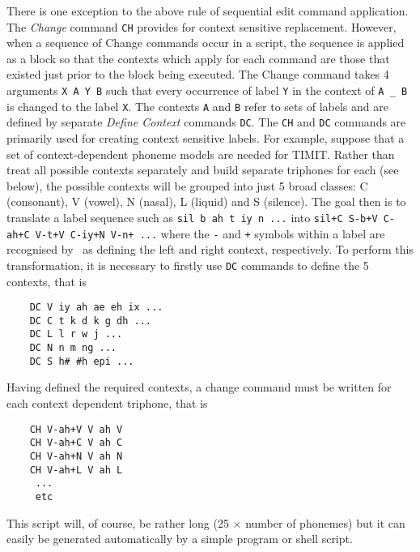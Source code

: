 There is one exception to the above rule of sequential edit command
application.  The {\it Change} command 
\texttt{CH} provides for context
sensitive replacement.  However, when a sequence of Change commands occur
in a script, the sequence is applied as a block so that the contexts
which apply for each command are those that existed just prior to the
block being executed. The Change command takes 4 arguments \texttt{X A Y
B} such that every occurrence of label \texttt{Y} in the context of
\texttt{A \_ B} is changed to the label \texttt{X}.  The contexts
\texttt{A} and \texttt{B} refer to sets of labels and  are defined by
separate \textit{Define Context} commands \texttt{DC}.   
The \texttt{CH} and
\texttt{DC} commands are primarily used for creating context sensitive
labels.  For example, suppose that a set of context-dependent phoneme
models are needed for TIMIT.  Rather than treat all possible contexts
separately and build separate triphones for each  (see below), the
possible contexts  will be grouped into just 5 broad classes: C
(consonant), V (vowel), N (nasal), L (liquid) and S (silence). The goal
then is to translate a label sequence such as \texttt{sil b ah t iy n ...}
into \texttt{sil+C S-b+V C-ah+C V-t+V C-iy+N V-n+ ...} where the
\texttt{-} and \texttt{+} symbols within a label are recognised by 
\HTK\ as defining the left and right context, respectively. To perform this
transformation, it is necessary to firstly use \texttt{DC} commands to
define the 5 contexts, that is
\begin{verbatim}
    DC V iy ah ae eh ix ... 
    DC C t k d k g dh ... 
    DC L l r w j ...
    DC N n m ng ...
    DC S h# #h epi ...
\end{verbatim}
Having defined the required contexts, a change command must be
written for each context dependent triphone, that is
\begin{verbatim}
    CH V-ah+V V ah V
    CH V-ah+C V ah C
    CH V-ah+N V ah N
    CH V-ah+L V ah L
     ...
     etc
\end{verbatim}
This script will, of course, be rather long (25 $\times$ number of
phonemes) but it can easily be generated automatically 
by a simple program or shell script.

